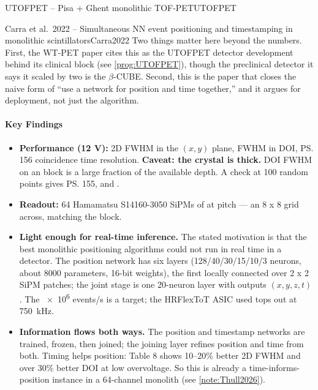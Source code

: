 \begin{programnote}{UTOFPET -- Pisa + Ghent monolithic TOF-PET}{UTOFPET}
\begin{papernote}{Carra et al.\ 2022 -- Simultaneous NN event positioning and timestamping in monolithic scintillators}{Carra2022}
Two things matter here beyond the numbers. First, the WT-PET paper cites this
as the UTOFPET detector development behind its clinical block (see
\ref{prog:UTOFPET}), though the preclinical detector it says it scaled by two is
the $\beta$-CUBE. Second,
this is the paper that closes the naive form of ``use a network for position and
time together,'' and it argues for deployment, not just the algorithm.

\paragraph{Key Findings}
\begin{itemize}
	\item \textbf{Performance (12 V):}  2D FWHM in the $(x,y)$ plane,
		 FWHM in DOI, \ps{156} coincidence time resolution.
		\textbf{Caveat: the crystal is  thick.}  DOI
		FWHM on an  block is a large fraction of the available depth.
		A check at 100 random points gives \ps{155},  and .
	\item \textbf{Readout:} 64 Hamamatsu S14160-3050 SiPMs of
		 at  pitch --- an 8 x 8 grid
		 across, matching the block.
	\item \textbf{Light enough for real-time inference.} The stated motivation
		is that the best monolithic positioning algorithms could not run in
		real time in a detector. The position network has six layers
		(128/40/30/15/10/3 neurons, about 8000 parameters, 16-bit weights), the
		first locally connected over 2 x 2 SiPM patches; the joint stage is one
		20-neuron layer with outputs $(x, y, z, t)$. The \num{e6} events/s is
		a target; the HRFlexToT ASIC used tops out at \qty{750}{\kilo\hertz}.
	\item \textbf{Information flows both ways.} The position and timestamp
		networks are trained, frozen, then joined; the joining layer refines
		position and time from both. Timing helps position: Table 8 shows 10--20\%
		better 2D FWHM and over 30\% better DOI at low overvoltage. So this is
		already a time-informs-position instance in a 64-channel monolith (see
		\ref{note:Thull2026}).
\end{itemize}


\end{papernote}
\end{programnote}

